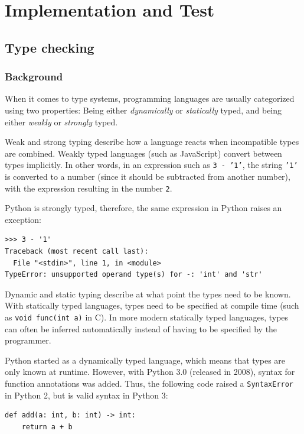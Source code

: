 \documentclass[a4paper,parskip=full,DIV=14,BCOR=15mm]{scrreprt}
\newcommand{\js}[1]{\texttt{#1}}
\begin{document}
\chapter{Implementation and Test}
\label{ch:implementation}

\section{Type checking}
\subsection{Background}
When it comes to type systems, programming languages are usually categorized
using two properties: Being either \emph{dynamically} or \emph{statically}
typed, and being either \emph{weakly} or \emph{strongly} typed.

Weak and strong typing describe how a language reacts when incompatible types
are combined. Weakly typed languages (such as JavaScript) convert between types
implicitly. In other words, in an expression such as
\js{3 - '1'}, the string \js{'1'} is converted to a number (since it should be
subtracted from another number), with the expression resulting in the number
\js{2}.

Python is strongly typed, therefore, the same expression in Python raises an
exception:

\begin{verbatim}
>​>​> 3 - '1'
Traceback (most recent call last):
  File "<stdin>", line 1, in <module>
TypeError: unsupported operand type(s) for -: 'int' and 'str'
\end{verbatim}

Dynamic and static typing describe at what point the types need to be known.
With statically typed languages, types need to be specified at compile time
(such as \texttt{void func(int a)} in C). In more modern statically typed
languages, types can often be inferred automatically instead of having to be
specified by the programmer.

Python started as a dynamically typed language, which means that types are only
known at runtime. However, with Python 3.0 (released in 2008), syntax for
function annotations was added. Thus, the following code raised a
\verb|SyntaxError| in Python 2, but is valid syntax in Python 3:

\begin{verbatim}
def add(a: int, b: int) -> int:
    return a + b
\end{verbatim}
\end{document}
